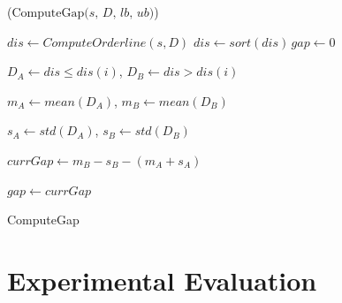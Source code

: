 \begin{algorithm}[h]
\DontPrintSemicolon
{}

\Begin($\text{ComputeGap} {(} s, \, D, \, lb, \, ub{)}$)
{
  $dis \leftarrow ComputeOrderline(s,D)$\;
  $dis \leftarrow sort(dis)\, gap \leftarrow 0$\;

  
    {
        $D_A \leftarrow dis \leq dis(i)$,
        $D_B \leftarrow dis > dis(i)$
     
       $m_A \leftarrow mean(D_A) $,
       $ m_B \leftarrow mean(D_B)$\;
       
       $s_A \leftarrow std(D_A)$,
       $s_B \leftarrow std(D_B)$\;
       
       $currGap \leftarrow m_B - s_B - (m_A + s_A)$
       
       {
       	$gap \leftarrow currGap$
       } 
      
    }  

}
\caption{ComputeGap}
\label{algoGap}
\end{algorithm}

\section[Experiments]{Experimental Evaluation}

